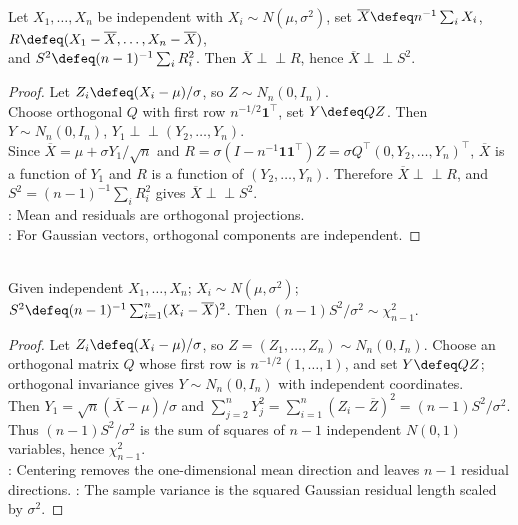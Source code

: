\begin{theorem} \label{thm:normal-mean-residual-independence} \\
Let $X_1,\ldots,X_n$ be independent with $X_i\sim N(\mu,\sigma^2)$, set $\overline{X}\defeq n^{-1}\sum_iX_i$, $R\defeq(X_1-\overline{X},\ldots,X_n-\overline{X})$,\\
and $S^2\defeq(n-1)^{-1}\sum_iR_i^2$. Then $\overline{X}\perp\!\!\!\perp R$, hence $\overline{X}\perp\!\!\!\perp S^2$.
\begin{proof} Let $Z_i\defeq(X_i-\mu)/\sigma$, so $Z\sim N_n(0,I_n)$.\\
Choose orthogonal $Q$ with first row $n^{-1/2}\mathbf{1}^\top$, set $Y\defeq QZ$. Then $Y\sim N_n(0,I_n)$, $Y_1\perp\!\!\!\perp(Y_2,\ldots,Y_n)$.\\
Since $\overline{X}=\mu+\sigma Y_1/\sqrt n$ and $R=\sigma(I-n^{-1}\mathbf{1}\mathbf{1}^\top)Z=\sigma Q^\top(0,Y_2,\ldots,Y_n)^\top$, $\overline{X}$ is a function of $Y_1$ and $R$ is a function of $(Y_2,\ldots,Y_n)$. Therefore $\overline{X}\perp\!\!\!\perp R$, and $S^2=(n-1)^{-1}\sum_iR_i^2$ gives $\overline{X}\perp\!\!\!\perp S^2$.\\
: Mean and residuals are orthogonal projections.\\
: For Gaussian vectors, orthogonal components are independent.
\end{proof}
\end{theorem}

\begin{theorem} \label{thm:normal-sample-variance-chi-square} \\
Given independent $X_1,\ldots,X_n$; $X_i\sim N(\mu,\sigma^2)$;$S^2\defeq(n-1)^{-1}\sum_{i=1}^n(X_i-\overline{X})^2$. Then $(n-1)S^2/\sigma^2\sim\chi^2_{n-1}$.
\begin{proof} Let $Z_i\defeq(X_i-\mu)/\sigma$, so $Z=(Z_1,\ldots,Z_n)\sim N_n(0,I_n)$. Choose an orthogonal matrix $Q$ whose first row is $n^{-1/2}(1,\ldots,1)$, and set $Y\defeq QZ$; orthogonal invariance gives $Y\sim N_n(0,I_n)$ with independent coordinates.\\
Then $Y_1=\sqrt n(\overline{X}-\mu)/\sigma$ and $\sum_{j=2}^nY_j^2=\sum_{i=1}^n(Z_i-\overline{Z})^2=(n-1)S^2/\sigma^2$.\\
Thus $(n-1)S^2/\sigma^2$ is the sum of squares of $n-1$ independent $N(0,1)$ variables, hence $\chi^2_{n-1}$.\\
: Centering removes the one-dimensional mean direction and leaves $n-1$ residual directions.
: The sample variance is the squared Gaussian residual length scaled by $\sigma^2$.
\end{proof}
\end{theorem}

